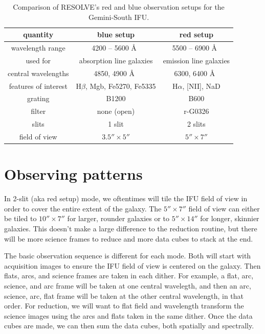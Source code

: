 \documentclass[12pt]{report}
\begin{document}
\begin{table}
\centering
\begin{tabular}[t]{ccc}
  \hline
quantity  & blue setup & red setup \\ \hline
wavelength range & 4200 -- 5600 \AA\ &  5500 -- 6900 \AA\ \\ 
used for & absorption line galaxies & emission line galaxies \\
central wavelengths & 4850, 4900 \AA\ & 6300, 6400 \AA\ \\
features of interest & H$\beta$, Mgb, Fe5270, Fe5335 & H$\alpha$, [NII], NaD \\ 
grating & B1200 & B600 \\ 
filter & none (open) & r-G0326 \\
slits & 1 slit & 2 slits \\ 
field of view & $3.5''\times5''$ & $5''\times7''$ \\ \hline
\end{tabular}
\caption[RESOLVE's Observation Setups]{Comparison of RESOLVE's red and blue observation setups for the Gemini-South IFU.}
\label{table:1}
\end{table}

\section{Observing patterns}
\label{patterns}
In 2-slit (aka red setup) mode, we oftentimes will tile the IFU field of view in order to cover the entire extent of the galaxy. The $5''\times7''$ field of view can either be tiled to $10''\times7''$ for larger, rounder galaxies or to  $5''\times14''$ for longer, skinnier galaxies. This doesn't make a large difference to the reduction routine, but there will be more science frames to reduce and more data cubes to stack at the end.

The basic observation sequence is different for each mode. Both will start with acquisition images to ensure the IFU field of view is centered on the galaxy. Then flats, arcs, and science frames are taken in each dither. For example, a flat, arc, science, and arc frame will be taken at one central wavelegth, and then an arc, science, arc, flat frame will be taken at the other central wavelength, in that order. For reduction, we will want to flat field and wavelength transform the science images using the arcs and flats taken in the same dither. Once the data cubes are made, we can then sum the data cubes, both spatially and spectrally.
\end{document}
